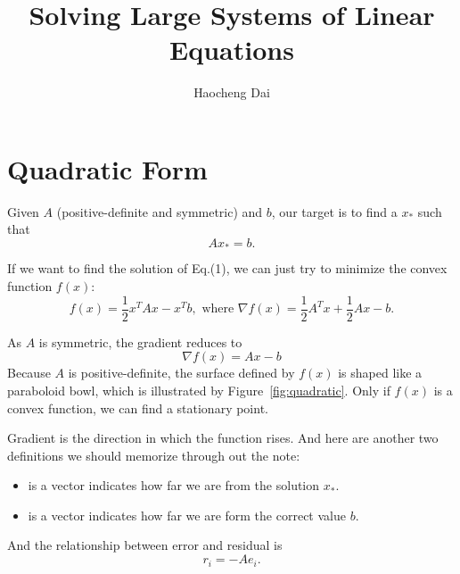 \documentclass{article}
\title{Solving Large Systems of Linear Equations}
\author{Haocheng Dai }
\date{}
\begin{document}
\maketitle
\section{Quadratic Form}
Given $A$ (positive-definite and symmetric) and $ b$, our target is to find a $x_*$ such that
\begin{equation}
    Ax_*= b.
\end{equation}

If we want to find the solution of Eq.(1), we can just try to minimize the convex function $f(x)$:
\begin{equation}
   f( x)=\frac{1}{2} x^TA x- x^T b,\text{   where } \nabla f( x)=\frac{1}{2}A^Tx+\frac{1}{2}Ax- b.
\end{equation}

As $A$ is symmetric, the gradient reduces to
\begin{equation*}
    \nabla f(x)=Ax-b
\end{equation*}
Because $A$ is positive-definite, the surface defined by $f(x)$ is shaped like a paraboloid bowl, which is illustrated by Figure~\ref{fig:quadratic}. Only if $f(x)$ is a convex function, we can find a stationary point.

Gradient is the direction in which the function rises. And here are another two definitions we should memorize through out the note:
\begin{itemize}
    \item {}   is a vector indicates how far we are from the solution $x_*$.
    \item {}  is a vector indicates how far we are form the correct value $b$.
\end{itemize}

And the relationship between error and residual is 
\begin{equation}
    r_i=-Ae_i.
\end{equation}
\end{document}
